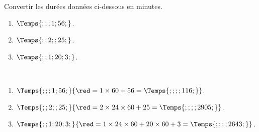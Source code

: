 \begin{exercice}
    Convertir les durées données ci-dessous en minutes.
    \begin{enumerate}
        \item $\Temps{;;;1;56;}$.
        \item $\Temps{;;2;;25;}$.
        \item $\Temps{;;1;20;3;}$.
    \end{enumerate}
 \end{exercice}
 
 \begin{corrige}
    \ \\ [-5mm]
    \begin{enumerate}
        \item $\Temps{;;;1;56;} {\red = 1\times 60 + 56 = \Temps{;;;;116;}}$.
        \item $\Temps{;;2;;25;} {\red = 2\times 24\times 60 + 25 = \Temps{;;;;2905;}}$.
        \item $\Temps{;;1;20;3;}{\red = 1\times 24\times 60 + 20\times 60 + 3 = \Temps{;;;;2643;}}$.
    \end{enumerate}
 \end{corrige}
